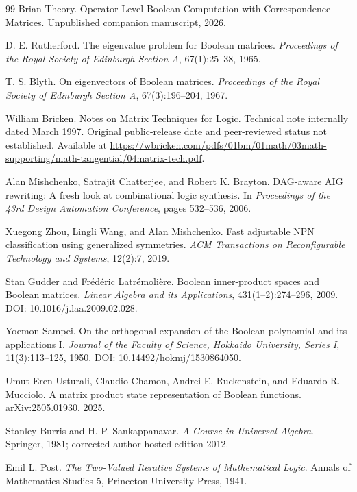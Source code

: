\documentclass[11pt]{article}
\theoremstyle{definition}
\theoremstyle{remark}
\begin{document}
\begin{thebibliography}{99}
Brian Theory.
\newblock Operator-Level Boolean Computation with Correspondence Matrices.
\newblock Unpublished companion manuscript, 2026.

D. E. Rutherford.
\newblock The eigenvalue problem for Boolean matrices.
\newblock \emph{Proceedings of the Royal Society of Edinburgh Section A}, 67(1):25--38, 1965.

T. S. Blyth.
\newblock On eigenvectors of Boolean matrices.
\newblock \emph{Proceedings of the Royal Society of Edinburgh Section A}, 67(3):196--204, 1967.

William Bricken.
\newblock Notes on Matrix Techniques for Logic.
\newblock Technical note internally dated March 1997.  Original public-release date and peer-reviewed status not established. Available at \url{https://wbricken.com/pdfs/01bm/01math/03math-supporting/math-tangential/04matrix-tech.pdf}.

Alan Mishchenko, Satrajit Chatterjee, and Robert K. Brayton.
\newblock DAG-aware AIG rewriting: A fresh look at combinational logic synthesis.
\newblock In \emph{Proceedings of the 43rd Design Automation Conference}, pages 532--536, 2006.

Xuegong Zhou, Lingli Wang, and Alan Mishchenko.
\newblock Fast adjustable NPN classification using generalized symmetries.
\newblock \emph{ACM Transactions on Reconfigurable Technology and Systems}, 12(2):7, 2019.

Stan Gudder and Fr\'ed\'eric Latr\'emoli\`ere.
\newblock Boolean inner-product spaces and Boolean matrices.
\newblock \emph{Linear Algebra and its Applications}, 431(1--2):274--296, 2009.
\newblock DOI: 10.1016/j.laa.2009.02.028.

Yoemon Sampei.
\newblock On the orthogonal expansion of the Boolean polynomial and its applications I.
\newblock \emph{Journal of the Faculty of Science, Hokkaido University, Series I}, 11(3):113--125, 1950.
\newblock DOI: 10.14492/hokmj/1530864050.

Umut Eren Usturali, Claudio Chamon, Andrei E. Ruckenstein, and Eduardo R. Mucciolo.
\newblock A matrix product state representation of Boolean functions.
\newblock arXiv:2505.01930, 2025.

Stanley Burris and H. P. Sankappanavar.
\newblock \emph{A Course in Universal Algebra}.
\newblock Springer, 1981; corrected author-hosted edition 2012.

Emil L. Post.
\newblock \emph{The Two-Valued Iterative Systems of Mathematical Logic}.
\newblock Annals of Mathematics Studies 5, Princeton University Press, 1941.

\end{thebibliography}
\end{document}
